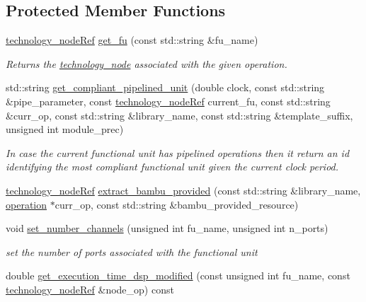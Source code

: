 \subsection*{Protected Member Functions}
\begin{DoxyCompactItemize}
\item 
\hyperlink{technology__node_8hpp_a33dd193b7bd6b987bf0d8a770a819fa7}{technology\+\_\+node\+Ref} \hyperlink{classallocation_a15d6ddec8f9a3eb2f499481ef96525e0}{get\+\_\+fu} (const std\+::string \&fu\+\_\+name)
\begin{DoxyCompactList}\small\item\em Returns the \hyperlink{structtechnology__node}{technology\+\_\+node} associated with the given operation. \end{DoxyCompactList}\item 
std\+::string \hyperlink{classallocation_a0bac9cf0d8365c80a4868c63398f3cd8}{get\+\_\+compliant\+\_\+pipelined\+\_\+unit} (double clock, const std\+::string \&pipe\+\_\+parameter, const \hyperlink{technology__node_8hpp_a33dd193b7bd6b987bf0d8a770a819fa7}{technology\+\_\+node\+Ref} current\+\_\+fu, const std\+::string \&curr\+\_\+op, const std\+::string \&library\+\_\+name, const std\+::string \&template\+\_\+suffix, unsigned int module\+\_\+prec)
\begin{DoxyCompactList}\small\item\em In case the current functional unit has pipelined operations then it return an id identifying the most compliant functional unit given the current clock period. \end{DoxyCompactList}\item 
\hyperlink{technology__node_8hpp_a33dd193b7bd6b987bf0d8a770a819fa7}{technology\+\_\+node\+Ref} \hyperlink{classallocation_a24b901da7ff60e973feddb65b2c7d23c}{extract\+\_\+bambu\+\_\+provided} (const std\+::string \&library\+\_\+name, \hyperlink{structoperation}{operation} $\ast$curr\+\_\+op, const std\+::string \&bambu\+\_\+provided\+\_\+resource)
\item 
void \hyperlink{classallocation_a6f4d2a8b3457f7ff1751b08154dfa0b7}{set\+\_\+number\+\_\+channels} (unsigned int fu\+\_\+name, unsigned int n\+\_\+ports)
\begin{DoxyCompactList}\small\item\em set the number of ports associated with the functional unit \end{DoxyCompactList}\item 
double \hyperlink{classallocation_aa14fbc0eb589e643571db7f9338a5471}{get\+\_\+execution\+\_\+time\+\_\+dsp\+\_\+modified} (const unsigned int fu\+\_\+name, const \hyperlink{technology__node_8hpp_a33dd193b7bd6b987bf0d8a770a819fa7}{technology\+\_\+node\+Ref} \&node\+\_\+op) const

\end{DoxyCompactItemize}
